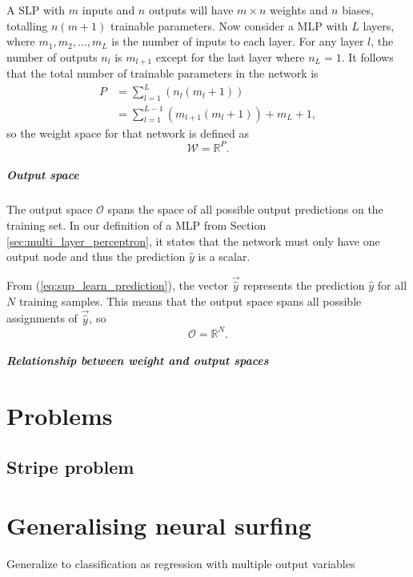 A SLP with $m$ inputs and $n$ outputs will have $m \times n$ weights and $n$ biases, totalling $n(m+1)$ trainable parameters.
Now consider a MLP with $L$ layers, where $m_1, m_2, \dots, m_L$ is the number of inputs to each layer. 
For any layer $l$, the number of outputs $n_l$ is $m_{l+1}$ except for the last layer where $n_L=1$.
It follows that the total number of trainable parameters in the network is
\begin{align*}
    P &= \sum_{l=1}^{L}{\left(n_l (m_l + 1)\right)} \\
    &= \sum_{l=1}^{L-1}{\left(m_{l+1} (m_l + 1)\right)} + m_L + 1,
\end{align*}
so the weight space for that network is defined as
\begin{equation}
    \mathcal{W} = \mathbb{R}^P.
\end{equation}

\paragraph{Output space}
The output space $\mathcal{O}$ spans the space of all possible output predictions on the training set.
In our definition of a MLP from Section \ref{sec:multi_layer_perceptron}, it states that the network must only have one output node and thus the prediction $\hat{y}$ is a scalar. 

From (\ref{eq:sup_learn_prediction}), the vector $\vec{\hat{y}}$ represents the prediction $\hat{y}$ for all $N$ training samples.
This means that the output space spans all possible assignments of $\vec{\hat{y}}$, so
\begin{equation}
    \mathcal{O}=\mathbb{R}^N.
\end{equation}

\paragraph{Relationship between weight and output spaces}
\todo

\chapter{Problems}
\section{Stripe problem}


\chapter{Generalising neural surfing}
Generalize to classification as regression with multiple output variables
